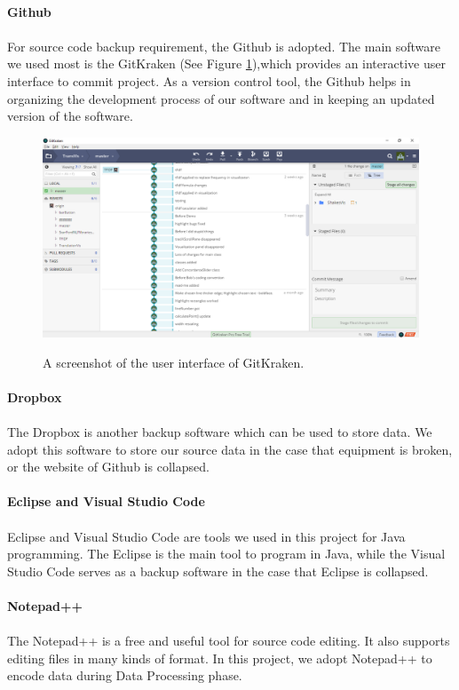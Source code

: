\paragraph{Github}
\paragraph[]{} For source code backup requirement, the Github is adopted. The main software we used most is the GitKraken (See Figure \ref{fig:gitKraken}),which provides an interactive user interface to commit project. As a version control tool, the Github helps in organizing the development process of our software and in keeping an updated version of the software.

\begin{figure}[H]
	\centering    
	\includegraphics[scale=0.4]{Figs/GitKraken}\\[1ex]
	\caption{A screenshot of the user interface of GitKraken.}
	\label{fig:gitKraken}
\end{figure}

\paragraph{Dropbox}
\paragraph[]{} The Dropbox is another backup software which can be used to store data. We adopt this software to store our source data in the case that equipment is broken, or the website of Github is collapsed.
\textit{}
\paragraph{Eclipse and Visual Studio Code}
\paragraph[]{} Eclipse and Visual Studio Code are tools we used in this project for Java programming. The Eclipse is the main tool to program in Java, while the Visual Studio Code serves as a backup software in the case that Eclipse is collapsed. 

\paragraph{Notepad++}
\paragraph[]{}The Notepad++ is a free and useful tool for source code editing. It also supports editing files in many kinds of format. In this project, we adopt Notepad++ to encode data during Data Processing phase.
